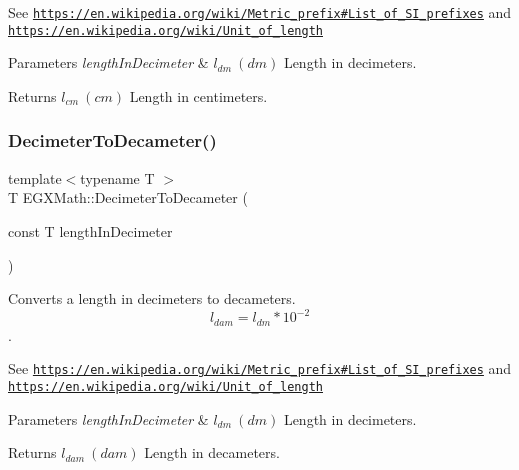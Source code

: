 See \href{https://en.wikipedia.org/wiki/Metric_prefix#List_of_SI_prefixes}{\tt https\+://en.\+wikipedia.\+org/wiki/\+Metric\+\_\+prefix\#\+List\+\_\+of\+\_\+\+S\+I\+\_\+prefixes} and \href{https://en.wikipedia.org/wiki/Unit_of_length}{\tt https\+://en.\+wikipedia.\+org/wiki/\+Unit\+\_\+of\+\_\+length} 
\begin{DoxyParams}{Parameters}
{\em length\+In\+Decimeter} & $ l_{dm}\ (dm)$ Length in decimeters. \\
\hline
\end{DoxyParams}
\begin{DoxyReturn}{Returns}
$ l_{cm}\ (cm)$ Length in centimeters. 
\end{DoxyReturn}
\mbox{\label{group___e_g_x_math-_conversions-_length_conversions-_s_i-_decimeter-_s_i_ga20742de42223dbcd8af88e4e9feccfa4}} 
\subsubsection{\texorpdfstring{Decimeter\+To\+Decameter()}{DecimeterToDecameter()}}
{\footnotesize\ttfamily template$<$typename T $>$ \\
T E\+G\+X\+Math\+::\+Decimeter\+To\+Decameter (\begin{DoxyParamCaption}\item[{const T}]{length\+In\+Decimeter }\end{DoxyParamCaption})}



Converts a length in decimeters to decameters. \[ l_{dam}=l_{dm} * 10^{-2} \]. 

See \href{https://en.wikipedia.org/wiki/Metric_prefix#List_of_SI_prefixes}{\tt https\+://en.\+wikipedia.\+org/wiki/\+Metric\+\_\+prefix\#\+List\+\_\+of\+\_\+\+S\+I\+\_\+prefixes} and \href{https://en.wikipedia.org/wiki/Unit_of_length}{\tt https\+://en.\+wikipedia.\+org/wiki/\+Unit\+\_\+of\+\_\+length} 
\begin{DoxyParams}{Parameters}
{\em length\+In\+Decimeter} & $ l_{dm}\ (dm)$ Length in decimeters. \\
\hline
\end{DoxyParams}
\begin{DoxyReturn}{Returns}
$ l_{dam}\ (dam)$ Length in decameters. 
\end{DoxyReturn}
\mbox{\label{group___e_g_x_math-_conversions-_length_conversions-_s_i-_decimeter-_s_i_ga9ee5daca58b2e6431c94ca9b8d5180b6}} 
